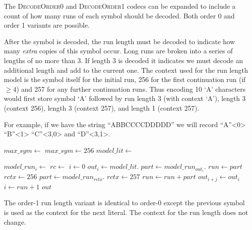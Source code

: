 \documentclass[a4paper]{article}
\begin{document}
The \textsc{DecodeOrder0} and \textsc{DecodeOrder1} codecs can be expanded to include a count of how many runs of each symbol should be decoded.
Both order 0 and order 1 variants are possible.

After the symbol is decoded, the run length must be decoded to
indicate how many \emph{extra} copies of this symbol occur.  Long runs
are broken into a series of lengths of no more than 3.  If length 3
is decoded it indicates we must decode an additional length and add to
the current one.  The context used for the run length model is the
symbol itself for the initial run, 256 for the first continuation run
(if $\ge 4$) and 257 for any further continuation runs.  Thus encoding
10 `A' characters would first store symbol `A' followed by run length
3 (with context `A'), length 3 (context 256), length 3 (context
257), and length 1 (context 257).

For example, if we have the string ``ABBCCCCDDDDD'' we will record ``A''<0> ``B''<1> ``C''<3,0> and ``D''<3,1>.

\begin{algorithmic}[1]
  \State $max\_sym \gets $
    \State $max\_sym \gets 256$
  \EndIf
  \State $model\_lit \gets $

    \State $model\_run_i \gets $
  \EndFor
  \Statex
  \State $rc \gets $
  \State $i \gets 0$
    \State $out_i \gets model\_lit.$
    \State $part \gets model\_run_{out_i}.$
    \State $run \gets part$
    \State $rctx \gets 256$
      \State $part \gets model\_run_{rctx}.$
      \State $rctx \gets 257$
      \State $run \gets run + part$
    \EndWhile
      \State $out_{i+j} \gets out_i$
    \EndFor
    \State $i \gets run+1$
  \EndWhile
  \State \Return $out$
\EndFunction
\end{algorithmic}

The order-1 run length variant is identical to order-0 except the
previous symbol is used as the context for the next literal.  The
context for the run length does not change.
\end{document}

